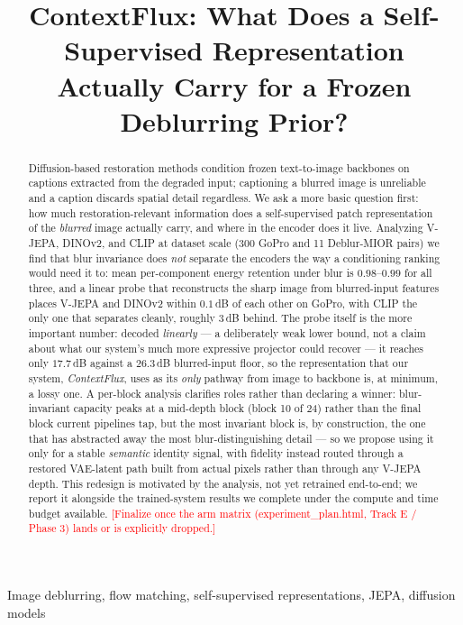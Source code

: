 \documentclass{article}
\title{ContextFlux: What Does a Self-Supervised Representation Actually Carry for a Frozen Deblurring Prior?}
\newcommand{\authnote}[1]{\textcolor{red}{\footnotesize [#1]}}
\begin{document}
\maketitle

\begin{abstract}
Diffusion-based restoration methods condition frozen text-to-image backbones on captions extracted from the degraded input; captioning a blurred image is unreliable and a caption discards spatial detail regardless. We ask a more basic question first: how much restoration-relevant information does a self-supervised patch representation of the \emph{blurred} image actually carry, and where in the encoder does it live. Analyzing V-JEPA, DINOv2, and CLIP at dataset scale (300 GoPro and 11 Deblur-MIOR pairs) we find that blur invariance does \emph{not} separate the encoders the way a conditioning ranking would need it to: mean per-component energy retention under blur is $0.98$--$0.99$ for all three, and a linear probe that reconstructs the sharp image from blurred-input features places V-JEPA and DINOv2 within $0.1$\,dB of each other on GoPro, with CLIP the only one that separates cleanly, roughly $3$\,dB behind. The probe itself is the more important number: decoded \emph{linearly} — a deliberately weak lower bound, not a claim about what our system's much more expressive projector could recover — it reaches only $17.7$\,dB against a $26.3$\,dB blurred-input floor, so the representation that our system, \emph{ContextFlux}, uses as its \emph{only} pathway from image to backbone is, at minimum, a lossy one. A per-block analysis clarifies roles rather than declaring a winner: blur-invariant capacity peaks at a mid-depth block (block 10 of 24) rather than the final block current pipelines tap, but the most invariant block is, by construction, the one that has abstracted away the most blur-distinguishing detail — so we propose using it only for a stable \emph{semantic} identity signal, with fidelity instead routed through a restored VAE-latent path built from actual pixels rather than through any V-JEPA depth. This redesign is motivated by the analysis, not yet retrained end-to-end; we report it alongside the trained-system results we complete under the compute and time budget available. \authnote{Finalize once the arm matrix (experiment\_plan.html, Track E / Phase 3) lands or is explicitly dropped.}
\end{abstract}

\begin{keywords}
Image deblurring, flow matching, self-supervised representations, JEPA, diffusion models
\end{keywords}
\end{document}
